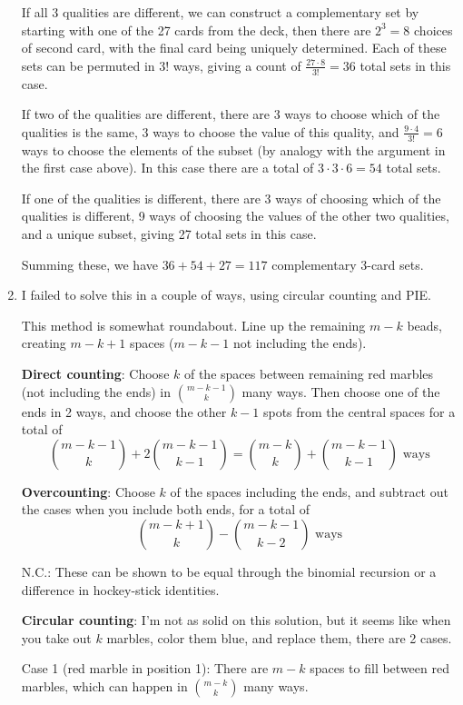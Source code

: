 \documentclass{book}
\numberwithin{equation}{section}
\begin{document}
\begin{enumerate}[label={2.\arabic*}]
If all 3 qualities are different, we can construct a complementary set by
starting with one of the 27 cards from the deck, then there are $2^3=8$
choices of second card, with the final card being uniquely determined.
Each of these sets can be permuted in $3!$ ways, giving a count of
$\frac{27 \cdot 8}{3!} = 36$ total sets in this case.

If two of the qualities are different, there are 3 ways to choose which of
the qualities is the same, 3 ways to choose the value of this quality, and
$\frac{9 \cdot 4}{3!} = 6$ ways to choose the elements of the subset (by
analogy with the argument in the first case above). In this case there are
a total of $3 \cdot 3 \cdot 6 = 54$ total sets.

If one of the qualities is different, there are 3 ways of choosing which of
the qualities is different, 9 ways of choosing the values of the other two
qualities, and a unique subset, giving 27 total sets in this case.

Summing these, we have $36 + 54 + 27 = 117$ complementary 3-card sets.

\item
I failed to solve this in a couple of ways, using circular counting and PIE.

This method is somewhat roundabout. Line up the remaining $m-k$ beads,
creating $m-k+1$ spaces ($m-k-1$ not including the ends).

\textbf{Direct counting}: Choose $k$ of the spaces between remaining red
marbles (not including the ends)
in ${m-k-1 \choose k}$ many ways. Then choose one of the ends in 2 ways, and
choose the other $k-1$ spots from the central spaces for a total of
$${m-k-1 \choose k} + 2{m-k-1 \choose k-1} = {m-k \choose k} +
{m-k-1 \choose k-1} \text{ ways}$$

\textbf{Overcounting}: Choose $k$ of the spaces including the ends, and
subtract out the cases when you include both ends, for a total of
$${m-k+1 \choose k} - {m-k-1 \choose k-2} \text{ ways}$$

N.C.: These can be shown to be equal through the binomial recursion or
a difference in hockey-stick identities.

\textbf{Circular counting}: I'm not as solid on this solution, but it seems
like when you take out $k$ marbles, color them blue, and replace them, there
are 2 cases.

Case 1 (red marble in position 1): There are $m-k$ spaces to fill between
red marbles, which can happen in ${m-k \choose k}$ many ways.


\end{enumerate}
\end{document}
